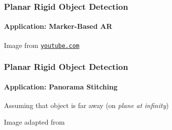\documentclass[xetex,professionalfont]{beamer}
\begin{document}

\begin{frame}
\frametitle{Planar Rigid Object Detection}
\framesubtitle{Application: Marker-Based AR}

\begin{center}
    {\centering Image from \href{https://www.youtube.com/watch?v=ChGW2Jogdjs}{\texttt{youtube.com}}}
\end{center}

\end{frame}


\begin{frame}
\frametitle{Planar Rigid Object Detection}
\framesubtitle{Application: Panorama Stitching}

Assuming that object is far away (on \textit{plane at infinity})  %

\medskip
\begin{center}
    {\centering Image adapted from \cite{brown2007}}
\end{center}

\end{frame}

\end{document}
